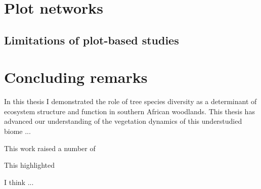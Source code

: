 \begin{refsection}
 

\section{Plot networks}

\subsection{Limitations of plot-based studies}

\section{Concluding remarks}

In this thesis I demonstrated the role of tree species diversity as a determinant of ecosystem structure and function in southern African woodlands. This thesis has advanced our understanding of the vegetation dynamics of this understudied biome ...

This work raised a number of 

This highlighted

I think ...

\newpage{}
\begingroup
{}
\printbibliography[heading=subbibintoc]
\endgroup

\end{refsection}

